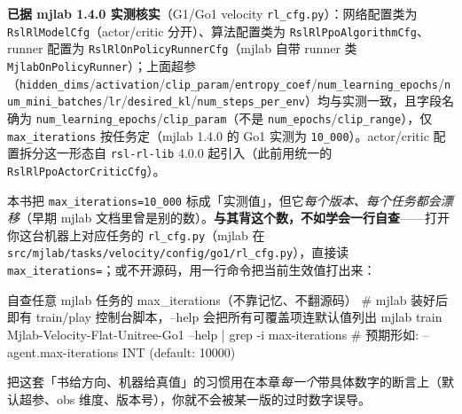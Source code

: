 \textbf{已据 mjlab 1.4.0 实测核实}（G1/Go1 velocity \texttt{rl\_cfg.py}）：网络配置类为 \texttt{RslRlModelCfg}（actor/critic 分开）、算法配置类为 \texttt{RslRlPpoAlgorithmCfg}、runner 配置为 \texttt{RslRlOnPolicyRunnerCfg}（mjlab 自带 runner 类 \texttt{MjlabOnPolicyRunner}）；上面超参（\texttt{hidden\_dims}/\allowbreak\texttt{activation}/\allowbreak\texttt{clip\_param}/\allowbreak\texttt{entropy\_coef}/\allowbreak\texttt{num\_learning\_epochs}/\allowbreak\texttt{num\_mini\_batches}/\allowbreak\texttt{lr}/\allowbreak\texttt{desired\_kl}/\allowbreak\texttt{num\_steps\_per\_env}）均与实测一致，且字段名确为 \texttt{num\_learning\_epochs}/\allowbreak\texttt{clip\_param}（不是 \texttt{num\_epochs}/\allowbreak\texttt{clip\_range}），仅 \texttt{max\_iterations} 按任务定（mjlab 1.4.0 的 Go1 实测为 \texttt{10\_000}）。actor/critic 配置拆分这一形态自 \texttt{rsl-rl-lib} 4.0.0 起引入（此前用统一的 \texttt{RslRlPpoActorCriticCfg}）。

\begin{insight}\label{ins:rlmc-mgr-recheck}
本书把 \texttt{max\_iterations=10\_000} 标成「实测值」，但它\emph{每个版本、每个任务都会漂移}（早期 mjlab 文档里曾是别的数）。\textbf{与其背这个数，不如学会一行自查}——打开你这台机器上对应任务的 \texttt{rl\_cfg.py}（mjlab 在 \texttt{src/\allowbreak mjlab/\allowbreak tasks/\allowbreak velocity/\allowbreak config/\allowbreak go1/\allowbreak rl\_cfg.\allowbreak py}），直接读 \texttt{max\_iterations=}；或不开源码，用一行命令把当前生效值打出来：
\begin{codebox}[bash]{自查任意 mjlab 任务的 max\_iterations（不靠记忆、不翻源码）}
# mjlab 装好后即有 train/play 控制台脚本，--help 会把所有可覆盖项连默认值列出
mjlab train Mjlab-Velocity-Flat-Unitree-Go1 --help | grep -i max-iterations
# 预期形如: --agent.max-iterations INT  (default: 10000)
\end{codebox}
\noindent 把这套「书给方向、机器给真值」的习惯用在本章\emph{每一个}带具体数字的断言上（默认超参、obs 维度、版本号），你就不会被某一版的过时数字误导。
\end{insight}


